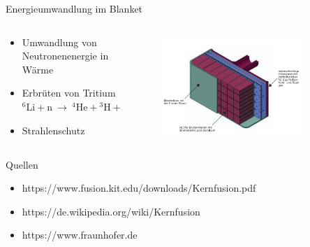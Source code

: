 \documentclass[aspectratio=169,xcolor=dvipsnames,14pt]{beamer}
\begin{document}
\begin{frame}{Energieumwandlung im Blanket}
    \begin{columns}
        \begin{column}{0.5\textwidth}
            \begin{itemize}
                \color{LightGrey}
                \item Umwandlung von Neutronenenergie in Wärme
                \item Erbrüten von Tritium \break \begin{math}
                    {\displaystyle ^{6}\mathrm {Li} +\mathrm {n} \ \to \ ^{4}\mathrm {He} +{}^{3}\mathrm {H} +4{,}8\;\mathrm {MeV} } \end{math}
                \item Strahlenschutz
            \end{itemize}
        \end{column}
        \begin{column}{0.5\textwidth}
            \begin{figure}
                \centering
                \includegraphics[width=0.85\textwidth]{Images/Blanket.png}
            \end{figure}
        \end{column}
    \end{columns}
\end{frame}
\begin{frame}{Quellen}
\begin{itemize}
    \color{LightGrey}
\item https://www.fusion.kit.edu/downloads/Kernfusion.pdf
\item https://de.wikipedia.org/wiki/Kernfusion
\item https://www.fraunhofer.de
\end{itemize}
\end{frame}
\end{document}
